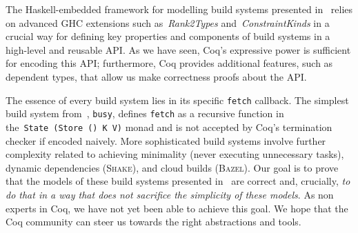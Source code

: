 \documentclass[sigplan]{acmart}\settopmatter{printfolios=true,printccs=false,printacmref=false}
\newcommand{\hs}{\texttt}
\newcommand{\Bazel}{\textsc{Bazel}\xspace}
\newcommand{\Shake}{\textsc{Shake}\xspace}
\begin{document}
The Haskell-embedded framework for modelling build systems presented
in~\cite{Mokhov2018icfp} relies on advanced GHC extensions such
as~\emph{Rank2Types} and~\emph{ConstraintKinds} in a crucial way for defining
key properties and components of build systems in a high-level and reusable API.
As we have seen, Coq's expressive power is sufficient for encoding this API;
furthermore, Coq provides additional features, such as dependent types, that
allow us make correctness proofs about the API.

The essence of every build system lies in its specific \hs{fetch} callback. The
simplest build system from~\cite{Mokhov2018icfp}, \hs{busy}, defines \hs{fetch}
as a recursive function in the~\hs{State}~\hs{(Store}~\hs{()}~\hs{K}~\hs{V)}
monad and is not accepted by Coq's termination checker if encoded naively. More
sophisticated build systems involve further complexity related to achieving
minimality (never executing unnecessary tasks), dynamic dependencies (\Shake),
and cloud builds (\Bazel). Our goal is to prove that the models of these
build systems presented in~\cite{Mokhov2018icfp} are correct and, crucially,
\emph{to do that in a way that does not sacrifice the simplicity of these models}.
As non experts in Coq, we have not yet been able to achieve this goal. We hope
that the Coq community can steer us towards the right abstractions and tools.



\end{document}
